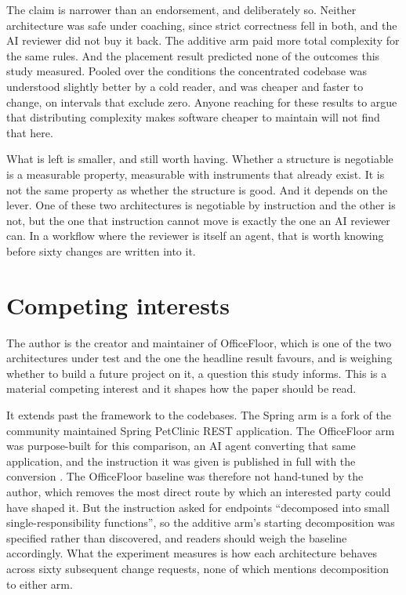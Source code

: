 \documentclass[11pt,a4paper]{article}
\begin{document}
The claim is narrower than an endorsement, and deliberately so. Neither
architecture was safe under coaching, since strict correctness fell in both, and
the AI reviewer did not buy it back. The additive arm paid more total complexity
for the same rules. And the placement result predicted none of the outcomes this
study measured. Pooled over the conditions the concentrated codebase was
understood slightly better by a cold reader, and was cheaper and faster to change,
on intervals that exclude zero. Anyone reaching for these results to argue that
distributing complexity makes software cheaper to maintain will not find that
here.

What is left is smaller, and still worth having. Whether a structure is negotiable
is a measurable property, measurable with instruments that already exist. It is
not the same property as whether the structure is good. And it depends on the
lever. One of these two architectures is negotiable by instruction and the other
is not, but the one that instruction cannot move is exactly the one an AI reviewer
can. In a workflow where the reviewer is itself an agent, that is worth knowing
before sixty changes are written into it.

\section*{Competing interests}

The author is the creator and maintainer of OfficeFloor, which is one of the two
architectures under test and the one the headline result favours, and is weighing
whether to build a future project on it, a question this study informs. This is a
material competing interest and it shapes how the paper should be read.

It extends past the framework to the codebases. The Spring arm is a fork of the
community maintained Spring PetClinic REST application. The OfficeFloor arm was
purpose-built for this comparison, an AI agent converting that same application,
and the instruction it was given is published in full with the conversion
\cite{conversion}. The OfficeFloor baseline was therefore not hand-tuned by the
author, which removes the most direct route by which an interested party could
have shaped it. But the instruction asked for endpoints ``decomposed into small
single-responsibility functions'', so the additive arm's starting decomposition
was specified rather than discovered, and readers should weigh the baseline
accordingly. What the experiment measures is how each architecture behaves across
sixty subsequent change requests, none of which mentions decomposition to either
arm.
\end{document}
